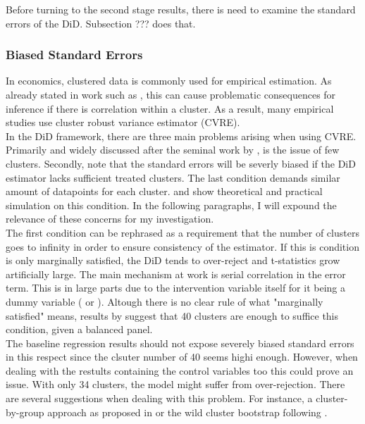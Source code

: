 \documentclass{article}
\begin{document}
Before turning to the second stage results, there is need to examine the standard errors of the DiD. Subsection ??? does that.

\subsubsection{Biased Standard Errors}

In economics, clustered data is commonly used for empirical estimation. As already stated in work such as \cite{moulton1990illustration}, this can cause problematic consequences for inference if there is correlation within a cluster. As a result, many empirical studies use cluster robust variance estimator (CVRE).\\
In the DiD framework, there are three main problems arising when using CVRE. Primarily and widely discussed after the seminal work by \cite{bertrand2004much}, is the issue of few clusters. Secondly, \cite{conley2011inference} note that the standard errors will be severly biased if the DiD estimator lacks sufficient treated clusters. The last condition demands similar amount of datapoints for each cluster. \cite{carter2017asymptotic} and \cite{mackinnon2017wild} show theoretical and practical simulation on this condition. In the following paragraphs, I will expound the relevance of these concerns for my investigation. \\
The first condition can be rephrased as a requirement that the number of clusters goes to infinity in order to ensure consistency of the estimator. If this is condition is only marginally satisfied, the DiD tends to over-reject and t-statistics grow artificially large. The main mechanism at work is serial correlation in the error term. This is in large parts due to the intervention variable itself for it being a dummy variable (\cite{bertrand2004much} or \cite{donald2007inference}). Altough there is no clear rule of what "marginally satisfied" means, results by \cite{cameron2008bootstrap} suggest that 40 clusters are enough to suffice this condition, given a balanced panel. \\
The baseline regression results should not expose severely biased standard errors in this respect since the clsuter number of 40 seems highi enough. However, when dealing with the restults containing the control variables too this could prove an issue. With only 34 clusters, the model might suffer from over-rejection. There are several suggestions when dealing with this problem. For instance, a cluster-by-group approach  as proposed in \cite{bertrand2004much} or the wild cluster bootstrap following \cite{cameron2008bootstrap}. \\
\end{document}
